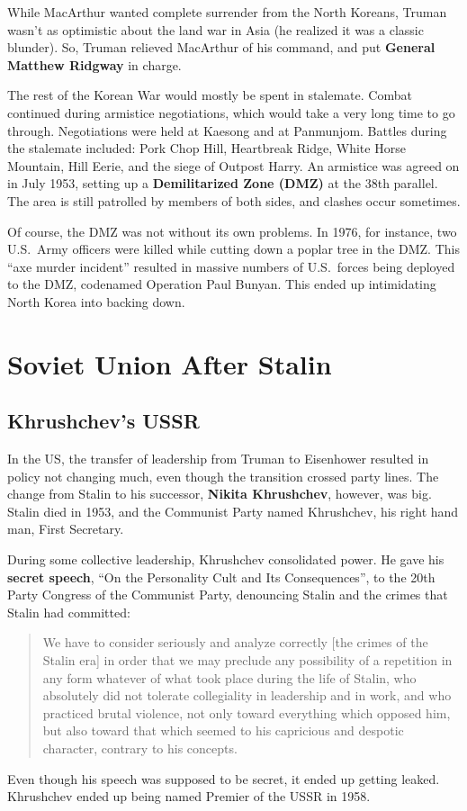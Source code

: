While MacArthur wanted complete surrender from the North Koreans,
Truman wasn't as optimistic about the land war in Asia (he realized it was a classic blunder).
So, Truman relieved MacArthur of his command, and put \textbf{General Matthew Ridgway} in charge.

The rest of the Korean War would mostly be spent in stalemate.
Combat continued during armistice negotiations, which would take a very long time to go through.
Negotiations were held at Kaesong and at Panmunjom.
Battles during the stalemate included:
Pork Chop Hill,
Heartbreak Ridge,
White Horse Mountain,
Hill Eerie,
and the siege of Outpost Harry.
An armistice was agreed on in July 1953,
setting up a \textbf{Demilitarized Zone (DMZ)} at the 38th parallel.
The area is still patrolled by members of both sides, and clashes occur sometimes.

Of course, the DMZ was not without its own problems.
In 1976, for instance,
two U.S.\ Army officers were killed while cutting down a poplar tree in the DMZ\@.
This ``axe murder incident'' resulted in massive numbers of U.S.\ forces being deployed to the DMZ,
codenamed Operation Paul Bunyan.
This ended up intimidating North Korea into backing down.

\section{Soviet Union After Stalin}

\subsection*{Khrushchev's USSR}

In the US,
the transfer of leadership from Truman to Eisenhower resulted in policy not changing much,
even though the transition crossed party lines.
The change from Stalin to his successor, \textbf{Nikita Khrushchev}, however, was big.
Stalin died in 1953, and the Communist Party named Khrushchev, his right hand man, First Secretary.

During some collective leadership, Khrushchev consolidated power.
He gave his \textbf{secret speech}, ``On the Personality Cult and Its Consequences'',
to the 20th Party Congress of the Communist Party,
denouncing Stalin and the crimes that Stalin had committed:
\begin{quote}
  We have to consider seriously and analyze correctly [the crimes of the Stalin era]
  in order that we may preclude any possibility of a repetition in any form whatever
  of what took place during the life of Stalin,
  who absolutely did not tolerate collegiality in leadership and in work,
  and who practiced brutal violence, not only toward everything which opposed him,
  but also toward that which seemed to his capricious and despotic character,
  contrary to his concepts.
\end{quote}
Even though his speech was supposed to be secret, it ended up getting leaked.
Khrushchev ended up being named Premier of the USSR in 1958.

